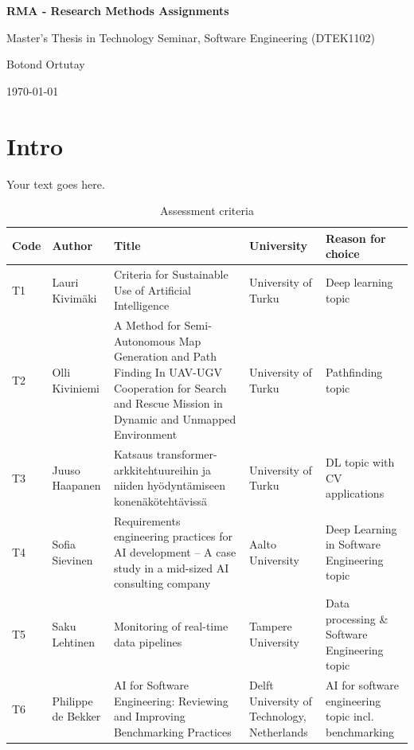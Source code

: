 \documentclass{article}
\begin{document}
\begin{titlepage}
    \centering
    \vspace*{4cm}
    {\LARGE\bfseries RMA - Research Methods Assignments\par}
    \vspace{1.3cm}
    {\large Master's Thesis in Technology Seminar, Software Engineering (DTEK1102)\par}
    \vspace{0.3cm}
    {\large Botond Ortutay\par}
    \vfill
    {\large \today\par}
\end{titlepage}

\tableofcontents
\clearpage

\section*{Intro}

Your text goes here.

\begin{table}[htbp]
	\centering
	\begin{tabular}{|p{0.428in}|p{0.856in}|p{1.712in}|p{0.856in}|p{1.284in}|}
		\hline
		Code & Author & Title & University & Reason for choice \\
		\hline
		T1 & Lauri Kivimäki & Criteria for Sustainable Use of Artificial Intelligence & University of Turku & Deep learning topic \\
		\hline
		T2 & Olli Kiviniemi & A Method for Semi-Autonomous Map Generation and Path Finding In UAV-UGV Cooperation for Search and Rescue Mission in Dynamic and Unmapped Environment & University of Turku & Pathfinding topic \\
		\hline
		T3 & Juuso Haapanen & Katsaus transformer-arkkitehtuureihin ja niiden hyödyntämiseen konenäkötehtävissä & University of Turku & DL topic with CV applications \\
		\hline
		T4 & Sofia Sievinen & Requirements engineering practices for AI development – A case study in a mid-sized AI consulting company & Aalto University & Deep Learning in Software Engineering topic \\
		\hline
		T5 & Saku Lehtinen & Monitoring of real-time data pipelines & Tampere University & Data processing \& Software Engineering topic \\
		\hline
		T6 & Philippe de Bekker & AI for Software Engineering: Reviewing and Improving Benchmarking Practices & Delft University of Technology, Netherlands & AI for software engineering topic incl. benchmarking \\
		\hline
	\end{tabular}
	\caption{Assessment criteria}
	\label{tab:assessment-criteria}
\end{table}
\end{document}

